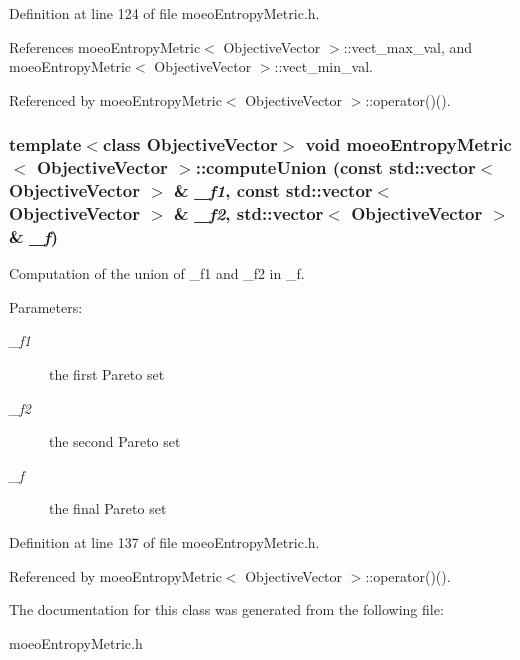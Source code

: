 Definition at line 124 of file moeo\-Entropy\-Metric.h.

References moeo\-Entropy\-Metric$<$ Objective\-Vector $>$::vect\_\-max\_\-val, and moeo\-Entropy\-Metric$<$ Objective\-Vector $>$::vect\_\-min\_\-val.

Referenced by moeo\-Entropy\-Metric$<$ Objective\-Vector $>$::operator()().
\subsubsection{\setlength{\rightskip}{0pt plus 5cm}template$<$class Objective\-Vector$>$ void {\bf moeo\-Entropy\-Metric}$<$ Objective\-Vector $>$::compute\-Union (const std::vector$<$ Objective\-Vector $>$ \& {\em \_\-f1}, const std::vector$<$ Objective\-Vector $>$ \& {\em \_\-f2}, std::vector$<$ Objective\-Vector $>$ \& {\em \_\-f})\hspace{0.3cm}{\tt  [inline, private]}}\label{classmoeoEntropyMetric_4b99c1842d780a89bda08e99a59e3e29}


Computation of the union of \_\-f1 and \_\-f2 in \_\-f. 

\begin{Desc}
\item[Parameters:]
\begin{description}
\item[{\em \_\-f1}]the first Pareto set \item[{\em \_\-f2}]the second Pareto set \item[{\em \_\-f}]the final Pareto set \end{description}
\end{Desc}


Definition at line 137 of file moeo\-Entropy\-Metric.h.

Referenced by moeo\-Entropy\-Metric$<$ Objective\-Vector $>$::operator()().

The documentation for this class was generated from the following file:\begin{CompactItemize}
\item 
moeo\-Entropy\-Metric.h\end{CompactItemize}
